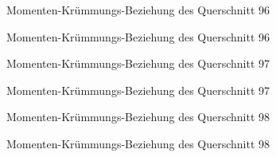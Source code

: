 \documentclass[
  11pt,
  letterpaper,
]{scrreprt}
\begin{document}
\begin{figure}[H]


\caption{\label{fig-qs_96}Momenten-Krümmungs-Beziehung des Querschnitt
96}

\end{figure}%

\begin{figure}[H]


\caption{\label{fig-m_chi_96}Momenten-Krümmungs-Beziehung des
Querschnitt 96}

\end{figure}%

\begin{figure}[H]


\caption{\label{fig-qs_97}Momenten-Krümmungs-Beziehung des Querschnitt
97}

\end{figure}%

\begin{figure}[H]


\caption{\label{fig-m_chi_97}Momenten-Krümmungs-Beziehung des
Querschnitt 97}

\end{figure}%

\begin{figure}[H]


\caption{\label{fig-qs_98}Momenten-Krümmungs-Beziehung des Querschnitt
98}

\end{figure}%

\begin{figure}[H]


\caption{\label{fig-m_chi_98}Momenten-Krümmungs-Beziehung des
Querschnitt 98}

\end{figure}%
\end{document}
